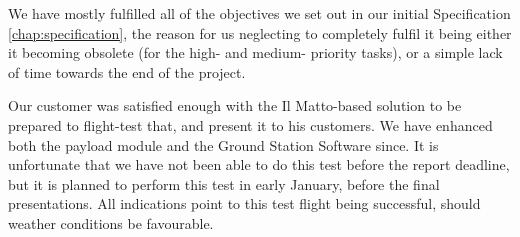 We have mostly fulfilled all of the objectives we set out in our initial 
Specification \ref{chap:specification}, the reason for us neglecting to completely 
fulfil it being either it becoming obsolete (for the high- and medium- 
priority tasks), or a simple lack of time towards the end of the project.

Our customer was satisfied enough with the Il Matto-based solution to be prepared 
to flight-test that, and present it to his customers. We have enhanced 
both the payload module and the Ground Station Software since. 
It is unfortunate that we have not been able to do this 
test before the report deadline, but it is planned to perform this test in 
early January, before the final presentations. All indications point to this 
test flight being successful, should weather conditions be favourable.
